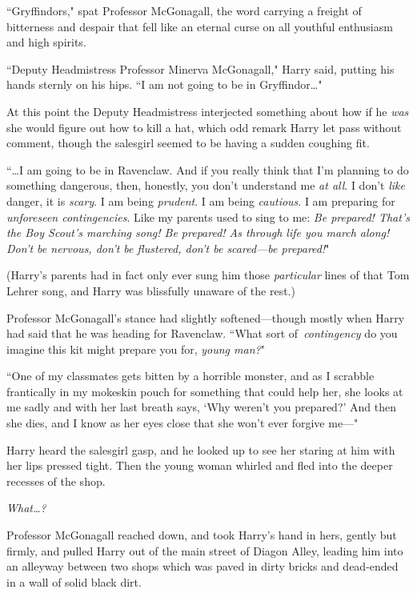 ``Gryffindors," spat Professor McGonagall, the word carrying a freight of bitterness and despair that fell like an eternal curse on all youthful enthusiasm and high spirits.

``Deputy Headmistress Professor Minerva McGonagall," Harry said, putting his hands sternly on his hips. ``I am not going to be in Gryffindor{\ldots}"

At this point the Deputy Headmistress interjected something about how if he \emph{was} she would figure out how to kill a hat, which odd remark Harry let pass without comment, though the salesgirl seemed to be having a sudden coughing fit.

``{\ldots}I am going to be in Ravenclaw. And if you really think that I'm planning to do something dangerous, then, honestly, you don't understand me \emph{at all}. I don't \emph{like} danger, it is \emph{scary}. I am being \emph{prudent}. I am being \emph{cautious}. I am preparing for \emph{unforeseen contingencies}. Like my parents used to sing to me: \emph{Be prepared! That's the Boy Scout's marching song! Be prepared! As through life you march along! Don't be nervous, don't be flustered, don't be scared—be prepared!}"

(Harry's parents had in fact only ever sung him those \emph{particular} lines of that Tom Lehrer song, and Harry was blissfully unaware of the rest.)

Professor McGonagall's stance had slightly softened—though mostly when Harry had said that he was heading for Ravenclaw. ``What sort of\linebreak\ \emph{contingency} do you imagine this kit might prepare you for, \emph{young man?}"

``One of my classmates gets bitten by a horrible monster, and as I scrabble frantically in my mokeskin pouch for something that could help her, she looks at me sadly and with her last breath says, `Why weren't you prepared?' And then she dies, and I know as her eyes close that she won't ever forgive me—"

Harry heard the salesgirl gasp, and he looked up to see her staring at him with her lips pressed tight. Then the young woman whirled and fled into the deeper recesses of the shop.

\emph{What{\ldots}?}

Professor McGonagall reached down, and took Harry's hand in hers, gently but firmly, and pulled Harry out of the main street of Diagon Alley, leading him into an alleyway between two shops which was paved in dirty bricks and dead-ended in a wall of solid black dirt.

